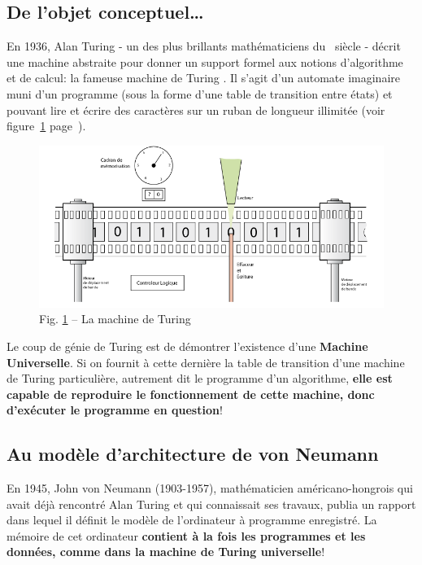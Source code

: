 \documentclass[11pt,french]{article}
\makeatletter
\def\maxwidth{\ifdim\Gin@nat@width>\linewidth\linewidth
    \else\Gin@nat@width\fi}
\let\Oldincludegraphics\includegraphics
\renewcommand{\includegraphics}[1]{\Oldincludegraphics[width=.8\maxwidth]{#1}}
\makeatother
\begin{document}
\hypertarget{de-lobjet-conceptuel}{%
\subsection{De l'objet conceptuel\ldots}\label{de-lobjet-conceptuel}}
En 1936, Alan Turing - un des plus brillants mathématiciens du \textsc{}~siècle - décrit une machine abstraite pour donner un support formel aux notions d’algorithme et de calcul: la fameuse \og machine de Turing \fg. Il s'agit d'un automate imaginaire muni d’un programme (sous la forme d’une table de transition entre états) et pouvant lire et écrire des caractères sur un ruban de longueur illimitée (voir figure~\ref{fig:turingmachine} page~\pageref{fig:turingmachine}).\par
\begin{figure}[h]
	\begin{center}
		\includegraphics{../img/turingmachine.png}
	\end{center}
	\caption{Fig. \ref{fig:turingmachine} -- La machine de Turing}
	\label{fig:turingmachine}
\end{figure}
Le coup de génie de Turing est de démontrer l’existence d’une \textbf{Machine Universelle}. Si on fournit à cette dernière la table de transition d’une machine de Turing particulière, autrement dit le programme d’un algorithme, \textbf{elle est capable de reproduire le fonctionnement de cette machine, donc d’exécuter le programme en question}!

\hypertarget{au-modele-architecture}{%
\subsection{Au modèle d'architecture de von Neumann}\label{au-modele-architecture}}
En 1945, John von Neumann (1903-1957), mathématicien américano-hongrois qui avait déjà rencontré Alan Turing et qui connaissait ses travaux, publia un rapport dans lequel il définit le modèle de l’ordinateur à \og programme enregistré\fg.  La mémoire de cet ordinateur \textbf{contient à la fois les programmes et les données, comme dans la machine de Turing universelle}!
\end{document}
